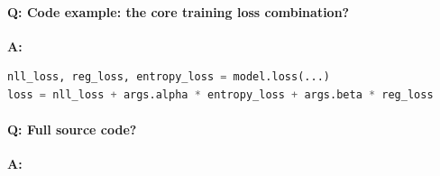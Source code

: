 \documentclass[11pt]{article}
\begin{document}
\paragraph{Q: Code example: the core training loss combination?}
\textbf{A:}
\begin{lstlisting}[language=Python]
nll_loss, reg_loss, entropy_loss = model.loss(...)
loss = nll_loss + args.alpha * entropy_loss + args.beta * reg_loss
\end{lstlisting}

\paragraph{Q: Full source code?}
\textbf{A:}

\end{document}
